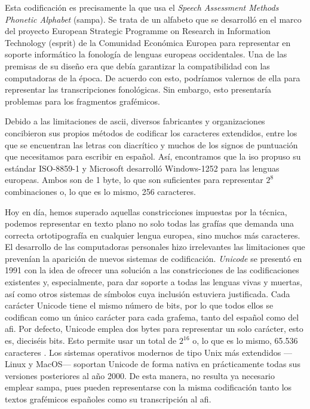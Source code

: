 Esta codificación es precisamente la que usa el \textit{Speech Assessment Methods Phonetic Alphabet} (\ac{sampa}). Se trata de un alfabeto que se desarrolló en el marco del proyecto European Strategic Programme on Research in Information Technology (\ac{esprit}) de la Comunidad Económica Europea para representar en soporte informático la fonología de lenguas europeas occidentales. Una de las premisas de su diseño era que debía garantizar la compatibilidad con las computadoras de la época. De acuerdo con esto, podríamos valernos de ella para representar las transcripciones fonológicas. Sin embargo, esto presentaría problemas para los fragmentos grafémicos.

Debido a las limitaciones de \ac{ascii}, diversos fabricantes y organizaciones concibieron sus propios métodos de codificar los caracteres extendidos, entre los que se encuentran las letras con diacrítico y muchos de los signos de puntuación que necesitamos para escribir en español. Así, encontramos que la \ac{iso} propuso su estándar ISO-8859-1 y Microsoft desarrolló Windows-1252 para las lenguas europeas. Ambos son de 1 byte, lo que son suficientes para representar $2^8$ combinaciones o, lo que es lo mismo, 256 caracteres.

Hoy en día, hemos superado aquellas constricciones impuestas por la técnica, podemos representar en texto plano no solo todas las grafías que demanda una correcta ortotipografía en cualquier lengua europea, sino muchos más caracteres. El desarrollo de las computadoras personales hizo irrelevantes las limitaciones que prevenían la aparición de nuevos sistemas de codificación. \textit{Unicode} se presentó en 1991 con la idea de ofrecer una solución a las constricciones de las  codificaciones existentes y, especialmente, para dar soporte a todas las lenguas vivas y muertas, así como otros sistemas de símbolos cuya inclusión estuviera justificada. Cada carácter Unicode tiene el mismo número de bits, por lo que todos ellos se codifican como un único carácter para cada grafema, tanto del español como del \ac{afi}. Por defecto, Unicode emplea dos bytes para representar un solo carácter, esto es, dieciséis bits. Esto permite usar un total de $2^{16}$ o, lo que es lo mismo, 65{.}536 caracteres \parencite{bettels1993}. Los sistemas operativos modernos de tipo Unix más extendidos —Linux y MacOS— soportan Unicode de forma nativa en prácticamente todas sus versiones posteriores al año 2000. De esta manera, no resulta ya necesario emplear \ac{sampa}, pues pueden representarse con la misma codificación tanto los textos grafémicos españoles como su transcripción al \ac{afi}.

